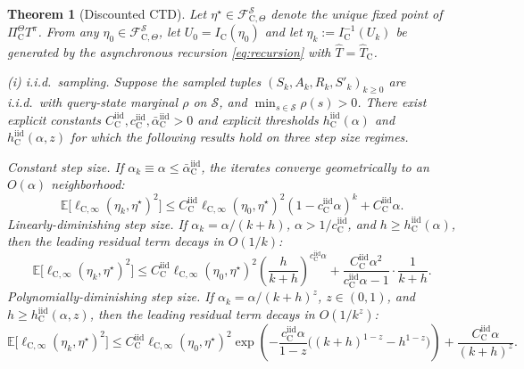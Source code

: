 \documentclass{article}
\newtheorem{theorem}{Theorem}
\newcommand{\X}{\mathcal{S}}
\newcommand{\E}{\mathbb{E}}
\begin{document}
\begin{theorem}[Discounted CTD]\label{thm:ctd-main2}
Let $\eta^\star \in \mathcal F_{\mathrm C,\Theta}^{\X}$ denote the unique fixed point of $\Pi_{\mathrm C}^{\Theta} T^\pi$. From any $\eta_0\in\mathcal F_{\mathrm C,\Theta}^{\X}$, let $U_0=I_{\mathrm C}(\eta_0)$ and let $\eta_k := I_{\mathrm C}^{-1}(U_k)$ be generated by the asynchronous recursion \eqref{eq:recursion} with $\widehat T = \widehat T_{\mathrm C}$.

\textup{(i) i.i.d.\ sampling.} Suppose the sampled tuples $(S_k,A_k,R_k,S'_k)_{k\ge 0}$ are i.i.d.\ with query-state marginal $\rho$ on $\X$, and $\min_{s \in \X}\rho(s) > 0$. There exist explicit constants $C^{\mathrm{iid}}_\mathrm C, c^{\mathrm{iid}}_\mathrm C, \bar \alpha^{\mathrm{iid}}_\mathrm C >0$ and explicit thresholds $h^{\mathrm{iid}}_\mathrm C(\alpha)$ and $h^{\mathrm{iid}}_\mathrm C(\alpha, z)$ for which the following results hold on three step size regimes.

\textup{Constant step size.} If $\alpha_k \equiv \alpha \le \bar \alpha ^{\mathrm{iid}}_\mathrm C$, the iterates converge geometrically to an $O(\alpha)$ neighborhood:
\begin{equation}
\E\bigl[\ell_{\mathrm C, \infty}(\eta_k, \eta^\star)^2 \bigr] \le C^{\mathrm{iid}}_\mathrm C \ell_{\mathrm C, \infty}(\eta_0, \eta^\star)^2(1- c^{\mathrm{iid}}_\mathrm C\alpha)^k + C^{\mathrm{iid}}_\mathrm C \alpha.
\end{equation}
\textup{Linearly-diminishing step size.} If $\alpha_k = \alpha / (k+h)$, $\alpha > 1/c^{\mathrm{iid}}_\mathrm C$, and $h \ge h^{\mathrm{iid}}_\mathrm C(\alpha)$, then the leading residual term decays in $O(1/k)$:
\begin{equation}
\E\bigl[\ell_{\mathrm C, \infty}(\eta_k, \eta^\star)^2 \bigr] \le C^{\mathrm{iid}}_\mathrm C \ell_{\mathrm C, \infty}(\eta_0, \eta^\star)^2\left(\frac{h}{k+h} \right)^{c^{\mathrm{iid}}_\mathrm C \alpha} + \frac{C^{\mathrm{iid}}_\mathrm C \alpha^2}{c^{\mathrm{iid}}_\mathrm C\alpha -1} \cdot \frac{1}{k+h}.
\end{equation}
\textup{Polynomially-diminishing step size.} If $\alpha_k = \alpha/(k+h)^z$, $z \in (0,1)$, and $h \ge h^{\mathrm{iid}}_\mathrm C(\alpha, z)$, then the leading residual term decays in $O(1/k^z)$:
\begin{equation}
\E\bigl[\ell_{\mathrm C, \infty}(\eta_k, \eta^\star)^2 \bigr] \le C^{\mathrm{iid}}_\mathrm C \ell_{\mathrm C, \infty}(\eta_0, \eta^\star)^2\exp\left(-\frac{c^{\mathrm{iid}}_\mathrm C \alpha}{1-z} \bigl((k+h)^{1-z} - h^{1-z} \bigr) \right) + \frac{C^{\mathrm{iid}}_\mathrm C \alpha}{(k+h)^z}.
\end{equation}


\end{theorem}
\end{document}
